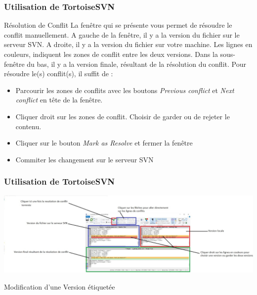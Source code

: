\documentclass{beamer}
\begin{document}
\begin{frame}
\frametitle{Utilisation de TortoiseSVN}
\begin{block}{Résolution de Conflit}
La fenêtre qui se présente vous permet de résoudre le conflit manuellement. A gauche de la fenêtre, il y a la version du fichier sur le serveur SVN.  A droite, il y a la version du fichier sur votre machine. Les lignes en couleurs, indiquent les zones de conflit entre les deux versions. Dans la sous-fenêtre du bas, il y a la version finale, résultant de la résolution du conflit.  Pour résoudre le(s) conflit(s), il suffit de :
\begin{itemize}
\item Parcourir les zones de conflits avec les boutons \alert{\textit{Previous conflict}} et \alert{\textit{Next conflict}} en tête de la fenêtre.
\item Cliquer droit sur les zones de conflit. Choisir de garder ou de rejeter le contenu.
\item Cliquer sur le bouton \alert{\textit{Mark as Resolve}} et fermer la fenêtre
\item Commiter les changement sur le serveur SVN
\end{itemize}

\end{block}
\end{frame}
\begin{frame}
\frametitle{Utilisation de TortoiseSVN}
\includegraphics[scale=0.3]{../images/conflit5.jpg}
\end{frame}


\begin{frame}
\begin{center}
\huge{Modification d'une Version étiquetée}
\end{center}
\end{frame}
\end{document}
